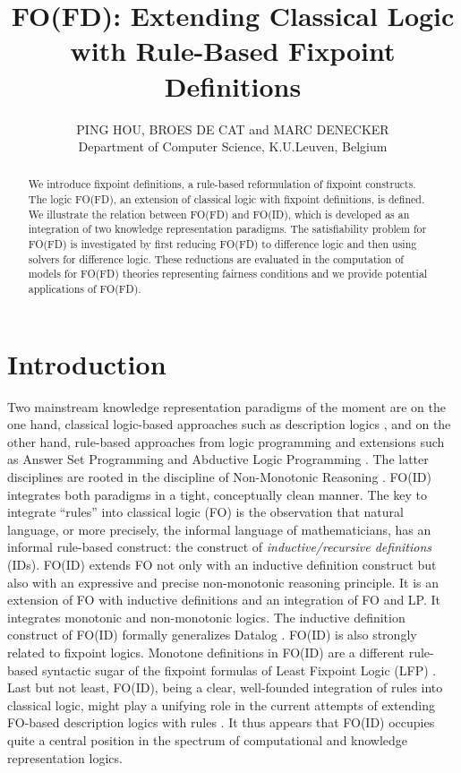 \documentclass{tlp}
\title{FO(FD): Extending Classical Logic with Rule-Based Fixpoint Definitions}
\author[P. Hou, B. de Cat and M. Denecker]
   {PING HOU, BROES DE CAT and MARC DENECKER\\
         Department of Computer Science, K.U.Leuven, Belgium\\
         \email{\{ping.hou, broes.decat, marc.denecker\}@cs.kuleuven.be}}
\begin{document}
\maketitle



\begin{abstract}
We introduce fixpoint definitions, a rule-based reformulation of fixpoint constructs. The logic FO(FD), an extension of classical logic with fixpoint definitions, is defined. We illustrate the relation between FO(FD) and FO(ID), which is developed as an integration of two knowledge representation paradigms. The satisfiability problem for FO(FD) is investigated by first reducing FO(FD) to difference logic and then using solvers for difference logic. These reductions are evaluated in the computation of models for FO(FD) theories representing fairness conditions and we provide potential applications of FO(FD).
\end{abstract}

\section{Introduction}
Two mainstream knowledge representation paradigms of the moment are on the one hand, classical logic-based approaches such as description logics \cite{dlog/2003handbook}, and on the other hand, rule-based approaches from logic programming and extensions such as Answer Set Programming and Abductive Logic Programming \cite{baral03,logcom/KakasKT92}. The latter disciplines are rooted in the discipline of Non-Monotonic Reasoning \cite{ai/McCarthy86}. FO(ID)~\cite{tocl/DeneckerT08} integrates both paradigms in a tight, conceptually clean manner. The key to integrate ``rules'' into classical logic (FO) is the observation that natural language, or more precisely, the informal language of mathematicians, has an informal rule-based construct: the construct of {\em inductive/recursive definitions} (IDs).
FO(ID) extends FO not only with an inductive definition construct but also with an expressive and precise non-monotonic reasoning principle. It is an extension of FO with inductive definitions and an integration of FO and LP. It integrates monotonic and non-monotonic logics. The inductive definition construct of FO(ID) formally generalizes Datalog \cite{aw/AbiteboulHV95}. FO(ID) is also strongly related to fixpoint logics.  Monotone definitions in FO(ID) are a different rule-based syntactic sugar of the fixpoint formulas of Least Fixpoint Logic (LFP) \cite{mi/Park70}. Last but not least, FO(ID), being a clear, well-founded integration of rules into classical logic, might play a unifying role in the current attempts of extending FO-based description logics with rules \cite{esws/VennekensD09}. It thus appears that FO(ID) occupies quite a central position in the spectrum of computational and knowledge representation logics.
\end{document}
